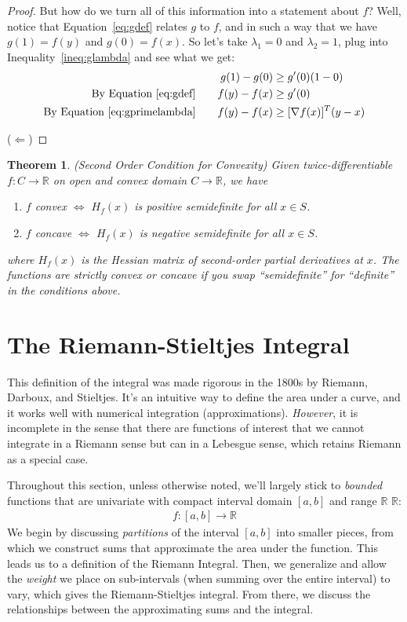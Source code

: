 \documentclass[12pt]{article}
\numberwithin{equation}{section} %
\theoremstyle{plain}
\newtheorem{thm}{Theorem}[section]
\theoremstyle{definition}
\theoremstyle{remark}
\newcommand{\R}{\mathbb{R}}
\begin{document}
\begin{proof}
But how do we turn all of this information into a statement about $f$?
Well, notice that Equation~\ref{eq:gdef} relates $g$ to $f$, and in such
a way that we have $g(1)=f(y)$ and $g(0)=f(x)$. So let's take
$\lambda_1=0$ and $\lambda_2=1$, plug into Inequality~\ref{ineq:glambda}
and see what we get:
\begin{align*}
  g(1) - g(0)
  &\geq g'(0)(1-0) \\
  \text{By Equation~\ref{eq:gdef}}\qquad
  f(y)-f(x)
  &\geq g'(0) \\
  \text{By Equation~\ref{eq:gprimelambda}}\qquad
  f(y)-f(x)
  &\geq [\nabla f(x)]^T (y-x) \\
\end{align*}

($\Leftarrow$)
\end{proof}

\begin{thm}{(Second Order Condition for Convexity)}
Given twice-differentiable $f:C\rightarrow\R$ on open and convex domain
$C\rightarrow\R$, we have
\begin{enumerate}
  \item $f$ convex $\iff$ $H_f(x)$ is positive semidefinite for all
    $x\in S$.
  \item $f$ concave $\iff$ $H_f(x)$ is negative semidefinite for all
    $x\in S$.
\end{enumerate}
where $H_f(x)$ is the Hessian matrix of second-order partial derivatives
at $x$. The functions are \emph{strictly} convex or concave if you
swap ``semidefinite'' for ``definite'' in the conditions above.
\end{thm}


\section{The Riemann-Stieltjes Integral}

This definition of the integral was made rigorous in the 1800s by
Riemann, Darboux, and Stieltjes.  It's an intuitive way to define the
area under a curve, and it works well with numerical integration
(approximations). \emph{However}, it is incomplete in the sense that
there are functions of interest that we cannot integrate in a Riemann
sense but can in a Lebesgue sense, which retains Riemann as a special
case.

Throughout this section, unless otherwise noted, we'll largely stick to
\emph{bounded} functions that are univariate with compact interval
domain $[a,b]$ and range $\R$
$\mathbb{R}$:
\begin{align*}
  f: [a, b] \rightarrow \mathbb{R}
\end{align*}
We begin by discussing \emph{partitions} of the interval $[a,b]$
into smaller pieces, from which we construct sums that approximate
the area under the function. This leads us to a definition of the
Riemann Integral. Then, we generalize and allow the \emph{weight} we
place on sub-intervals (when summing over the entire interval) to vary,
which gives the Riemann-Stieltjes integral. From there, we discuss the
relationships between the approximating sums and the integral.
\end{document}
